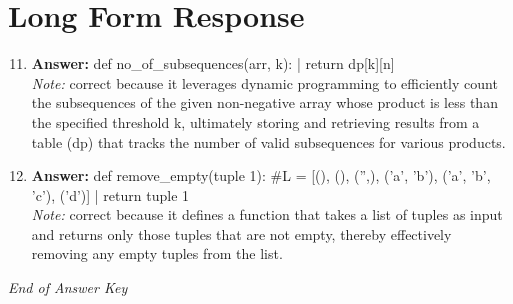 \documentclass[12pt]{article}
\begin{document}
\section*{Long Form Response}
\begin{enumerate}[label=\arabic*.]
\setcounter{enumi}{10}
\item \textbf{Answer:} def no\_of\_subsequences(arr, k): | return dp[k][n]
\\ \textit{Note:} correct because it leverages dynamic programming to efficiently count the subsequences of the given non-negative array whose product is less than the specified threshold k, ultimately storing and retrieving results from a table (dp) that tracks the number of valid subsequences for various products.
\item \textbf{Answer:} def remove\_empty(tuple 1): \#L = [(), (), ('',), ('a', 'b'), ('a', 'b', 'c'), ('d')] | return tuple 1
\\ \textit{Note:} correct because it defines a function that takes a list of tuples as input and returns only those tuples that are not empty, thereby effectively removing any empty tuples from the list.
\end{enumerate}

\vfill
\noindent\textit{End of Answer Key}
\end{document}
